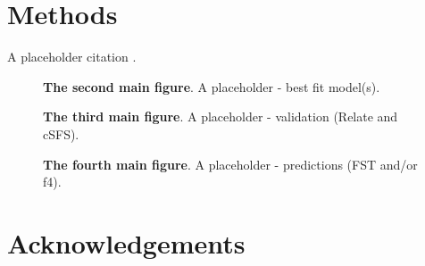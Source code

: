 \documentclass[]{article}
\begin{document}
\section*{Methods}
A placeholder citation \citep{Kelleher2016-lw}.

\begin{figure}[ht]
\begin{center}
\makebox[\textwidth][c]{} %
\caption{\textbf{The second main figure}.
    A placeholder - best fit model(s).
}
\label{fig:2}
\end{center}
\end{figure}

\begin{figure}[ht]
\begin{center}
    \makebox[\textwidth][c]{} %
\caption{\textbf{The third main figure}.
    A placeholder - validation (Relate and cSFS).
}
\label{fig:3}
\end{center}
\end{figure}

\begin{figure}[ht]
\begin{center}
    \makebox[\textwidth][c]{} %
\caption{\textbf{The fourth main figure}.
    A placeholder - predictions (FST and/or f4).
}
\label{fig:4}
\end{center}
\end{figure}

\section*{Acknowledgements}

\break



\end{document}

